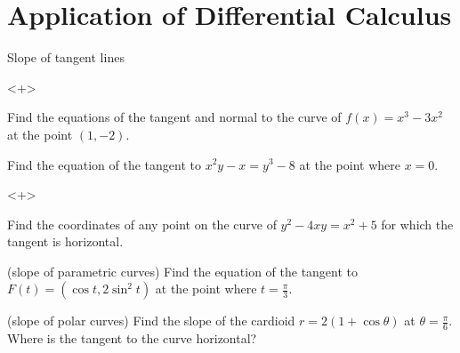 \section[AppofDiff]{Application of Differential Calculus}
\begin{frame}{Slope of tangent lines}

\begin{onlyenv}<+>

\begin{example}
Find the equations of the tangent and normal to the curve of $f\left(x\right)=x^{3}-3x^{2}$
at the point $\left(1,-2\right)$.
\end{example}



\begin{example}
Find the equation of the tangent to $x^{2}y-x=y^{3}-8$ at the point
where $x=0$.
\end{example}

\end{onlyenv}



\begin{onlyenv}<+>

\begin{example}
Find the coordinates of any point on the curve of $y^{2}-4xy=x^{2}+5$
for which the tangent is horizontal.
\end{example}



\begin{example}
(slope of parametric curves) Find the equation of the tangent to $F\left(t\right)=\left(\cos t,2\sin^{2}t\right)$
at the point where $t=\frac{\pi}{3}$.
\end{example}



\begin{example}
(slope of polar curves) Find the slope of the cardioid $r=2\left(1+\cos\theta\right)$
at $\theta=\frac{\pi}{6}$. Where is the tangent to the curve horizontal?
\end{example}

\end{onlyenv}

\end{frame}


